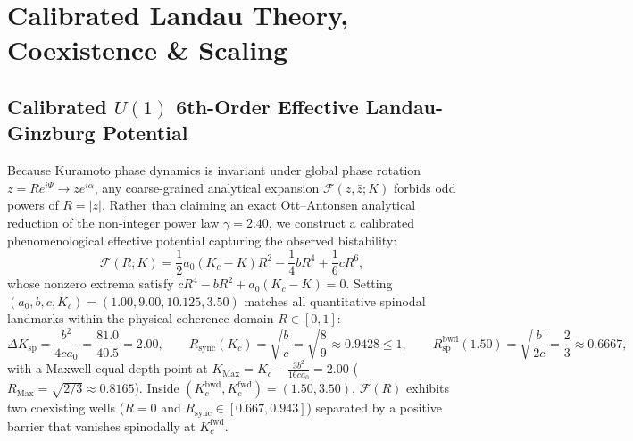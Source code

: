 \documentclass[11pt,a4paper]{article}
\begin{document}
\section{Calibrated Landau Theory, Coexistence \& Scaling}

\subsection{Calibrated \texorpdfstring{$U(1)$}{U(1)} 6th-Order Effective Landau-Ginzburg Potential}
Because Kuramoto phase dynamics is invariant under global phase rotation $z = R e^{i\Psi} \to z e^{i\alpha}$, any coarse-grained analytical expansion $\mathcal{F}(z, \bar{z}; K)$ forbids odd powers of $R = |z|$. Rather than claiming an exact Ott--Antonsen analytical reduction of the non-integer power law $\gamma = 2.40$, we construct a calibrated phenomenological effective potential capturing the observed bistability:
\begin{equation}
    \mathcal{F}(R; K) = \frac{1}{2} a_0 (K_c - K) R^2 - \frac{1}{4} b R^4 + \frac{1}{6} c R^6,
\end{equation}
whose nonzero extrema satisfy $c R^4 - b R^2 + a_0 (K_c - K) = 0$. Setting $(a_0, b, c, K_c) = (1.00, 9.00, 10.125, 3.50)$ matches all quantitative spinodal landmarks within the physical coherence domain $R \in [0, 1]$:
\begin{equation}
\Delta K_{\mathrm{sp}} = \frac{b^2}{4 c a_0} = \frac{81.0}{40.5} = 2.00, \qquad R_{\mathrm{sync}}(K_c) = \sqrt{\frac{b}{c}} = \sqrt{\frac{8}{9}} \approx 0.9428 \le 1, \qquad R_{\mathrm{sp}}^{\mathrm{bwd}}(1.50) = \sqrt{\frac{b}{2c}} = \frac{2}{3} \approx 0.6667,
\end{equation}
with a Maxwell equal-depth point at $K_{\mathrm{Max}} = K_c - \frac{3 b^2}{16 c a_0} = 2.00$ ($R_{\mathrm{Max}} = \sqrt{2/3} \approx 0.8165$). Inside $(K_c^{\mathrm{bwd}}, K_c^{\mathrm{fwd}}) = (1.50, 3.50)$, $\mathcal{F}(R)$ exhibits two coexisting wells ($R = 0$ and $R_{\mathrm{sync}} \in [0.667, 0.943]$) separated by a positive barrier that vanishes spinodally at $K_c^{\mathrm{fwd}}$.
\end{document}
